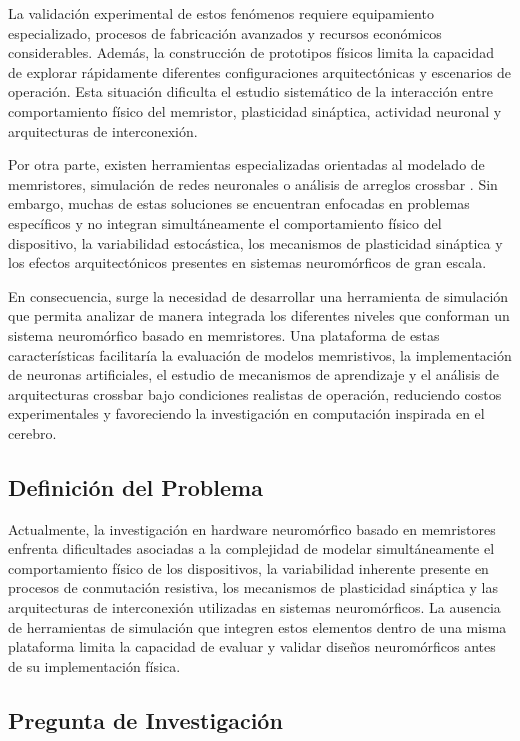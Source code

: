 La validación experimental de estos fenómenos requiere equipamiento especializado, procesos de fabricación avanzados y recursos económicos considerables. Además, la construcción de prototipos físicos limita la capacidad de explorar rápidamente diferentes configuraciones arquitectónicas y escenarios de operación. Esta situación dificulta el estudio sistemático de la interacción entre comportamiento físico del memristor, plasticidad sináptica, actividad neuronal y arquitecturas de interconexión.

Por otra parte, existen herramientas especializadas orientadas al modelado de memristores, simulación de redes neuronales o análisis de arreglos crossbar \cite{20,23,24}. Sin embargo, muchas de estas soluciones se encuentran enfocadas en problemas específicos y no integran simultáneamente el comportamiento físico del dispositivo, la variabilidad estocástica, los mecanismos de plasticidad sináptica y los efectos arquitectónicos presentes en sistemas neuromórficos de gran escala.

En consecuencia, surge la necesidad de desarrollar una herramienta de simulación que permita analizar de manera integrada los diferentes niveles que conforman un sistema neuromórfico basado en memristores. Una plataforma de estas características facilitaría la evaluación de modelos memristivos, la implementación de neuronas artificiales, el estudio de mecanismos de aprendizaje y el análisis de arquitecturas crossbar bajo condiciones realistas de operación, reduciendo costos experimentales y favoreciendo la investigación en computación inspirada en el cerebro.

\subsection{Definición del Problema}

Actualmente, la investigación en hardware neuromórfico basado en memristores enfrenta dificultades asociadas a la complejidad de modelar simultáneamente el comportamiento físico de los dispositivos, la variabilidad inherente presente en procesos de conmutación resistiva, los mecanismos de plasticidad sináptica y las arquitecturas de interconexión utilizadas en sistemas neuromórficos. La ausencia de herramientas de simulación que integren estos elementos dentro de una misma plataforma limita la capacidad de evaluar y validar diseños neuromórficos antes de su implementación física.

\subsection{Pregunta de Investigación}

